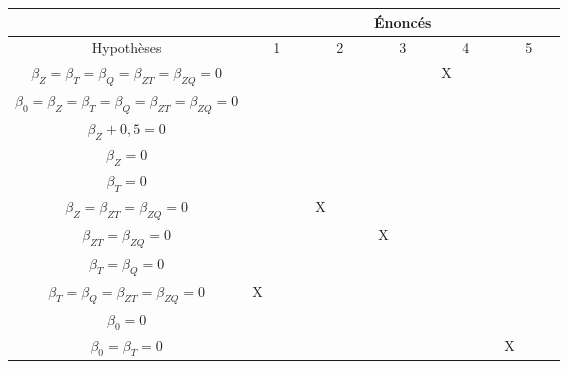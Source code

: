 \begin{questions}
\begin{parts}
\begin{solution}
\begin{tabular}{|c||ccccc|}
\hline
& \multicolumn{5}{c|}{Énoncés}\\ \hline
Hypothèses & \multicolumn{1}{l||}{~~~1~~~} & \multicolumn{1}{l||}{~~~2~~~} & \multicolumn{1}{l||}{~~~3~~~} & \multicolumn{1}{l||}{~~~4~~~} & \multicolumn{1}{l||}{~~~5~~~} \\ \hline
$ \beta_Z = \beta_T = \beta_Q = \beta_{ZT} = \beta_{ZQ} = 0  $ & \multicolumn{1}{l||}{}  & \multicolumn{1}{l||}{}  & \multicolumn{1}{l||}{}  & \multicolumn{1}{l||}{X}  & \multicolumn{1}{l||}{}     \\ \hline
$ \beta_0 = \beta_Z = \beta_T = \beta_Q = \beta_{ZT} = \beta_{ZQ} = 0  $ & \multicolumn{1}{l||}{}  & \multicolumn{1}{l||}{}  & \multicolumn{1}{l||}{}  & \multicolumn{1}{l||}{}  & \multicolumn{1}{l||}{}     \\ \hline
$ \beta_Z + 0,5 = 0 $ & \multicolumn{1}{l||}{}  & \multicolumn{1}{l||}{}  & \multicolumn{1}{l||}{}  & \multicolumn{1}{l||}{}  & \multicolumn{1}{l||}{}     \\ \hline
$ \beta_Z = 0 $ & \multicolumn{1}{l||}{}  & \multicolumn{1}{l||}{}  & \multicolumn{1}{l||}{}  & \multicolumn{1}{l||}{}  & \multicolumn{1}{l||}{}     \\ \hline
$ \beta_T = 0 $ & \multicolumn{1}{l||}{}  & \multicolumn{1}{l||}{}  & \multicolumn{1}{l||}{}  & \multicolumn{1}{l||}{}  & \multicolumn{1}{l||}{}     \\ \hline
$ \beta_Z = \beta_{ZT} = \beta_{ZQ} = 0  $ & \multicolumn{1}{l||}{}  & \multicolumn{1}{l||}{X}  & \multicolumn{1}{l||}{}  & \multicolumn{1}{l||}{}  & \multicolumn{1}{l||}{}     \\ \hline
$ \beta_{ZT} = \beta_{ZQ} = 0 $ & \multicolumn{1}{l||}{}  & \multicolumn{1}{l||}{}  & \multicolumn{1}{l||}{X}  & \multicolumn{1}{l||}{}  & \multicolumn{1}{l||}{}     \\ \hline
$ \beta_T = \beta_Q = 0 $ & \multicolumn{1}{l||}{}  & \multicolumn{1}{l||}{}  & \multicolumn{1}{l||}{}  & \multicolumn{1}{l||}{}  & \multicolumn{1}{l||}{}     \\ \hline
$ \beta_T = \beta_Q = \beta_{ZT} = \beta_{ZQ} = 0 $ & \multicolumn{1}{l||}{X}  & \multicolumn{1}{l||}{}  & \multicolumn{1}{l||}{}  & \multicolumn{1}{l||}{}  & \multicolumn{1}{l||}{}   \\ \hline
$ \beta_0 = 0 $ & \multicolumn{1}{l||}{}  & \multicolumn{1}{l||}{}  & \multicolumn{1}{l||}{}  & \multicolumn{1}{l||}{}  & \multicolumn{1}{l||}{}     \\ \hline
$ \beta_0 = \beta_T = 0 $ & \multicolumn{1}{l||}{}  & \multicolumn{1}{l||}{}  & \multicolumn{1}{l||}{}  & \multicolumn{1}{l||}{}  & \multicolumn{1}{l||}{X}     \\ \hline
\end{tabular}
\end{solution}


\end{parts}
\end{questions}
